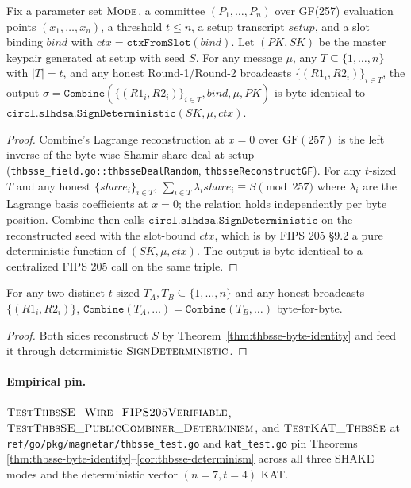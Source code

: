 \begin{theorem}
\label{thm:thbsse-byte-identity}
Fix a parameter set $\textsc{Mode}$, a committee
$(P_1, \ldots, P_n)$ over GF(257) evaluation points
$(x_1, \ldots, x_n)$, a threshold $t \le n$, a setup transcript
$\mathit{setup}$, and a slot binding $\mathit{bind}$ with
$\mathit{ctx} = \texttt{ctxFromSlot}(\mathit{bind})$. Let
$(\mathit{PK}, \mathit{SK})$ be the master keypair generated at
setup with seed $S$. For any message $\mu$, any
$T \subseteq \{1, \ldots, n\}$ with $|T| = t$, and any honest
Round-1/Round-2 broadcasts $\{(R1_i, R2_i)\}_{i \in T}$, the
output
$\sigma = \texttt{Combine}(\{(R1_i, R2_i)\}_{i \in T},
\mathit{bind}, \mu, \mathit{PK})$ is byte-identical to
$\texttt{circl.slhdsa.SignDeterministic}(\mathit{SK}, \mu,
\mathit{ctx})$.
\end{theorem}

\begin{proof}
Combine's Lagrange reconstruction at $x = 0$ over
$\mathrm{GF}(257)$ is the left inverse of the byte-wise Shamir
share deal at setup
(\texttt{thbsse\_field.go::thbsseDealRandom},
\texttt{thbsseReconstructGF}). For any $t$-sized
$T$ and any honest $\{\mathit{share}_i\}_{i \in T}$,
$\sum_{i \in T} \lambda_i \mathit{share}_i \equiv S \pmod{257}$
where $\lambda_i$ are the Lagrange basis coefficients at $x=0$;
the relation holds independently per byte position. Combine
then calls
$\texttt{circl.slhdsa.SignDeterministic}$ on the reconstructed
seed with the slot-bound $\mathit{ctx}$, which is by FIPS 205
\S 9.2 a pure deterministic function of $(\mathit{SK}, \mu,
\mathit{ctx})$. The output is byte-identical to a centralized
FIPS 205 call on the same triple.
\end{proof}

\begin{corollary}
\label{cor:thbsse-determinism}
For any two distinct $t$-sized
$T_A, T_B \subseteq \{1, \ldots, n\}$ and any honest
broadcasts $\{(R1_i, R2_i)\}$,
$\texttt{Combine}(T_A, \dots) = \texttt{Combine}(T_B, \dots)$
byte-for-byte.
\end{corollary}

\begin{proof}
Both sides reconstruct $S$ by
Theorem~\ref{thm:thbsse-byte-identity} and feed it through
deterministic $\textsc{SignDeterministic}$.
\end{proof}

\paragraph{Empirical pin.}
$\textsc{TestThbsSE\_Wire\_FIPS205Verifiable}$,
$\textsc{TestThbsSE\_PublicCombiner\_Determinism}$, and
$\textsc{TestKAT\_ThbsSe}$ at
\texttt{ref/go/pkg/magnetar/thbsse\_test.go} and
\texttt{kat\_test.go} pin Theorems
\ref{thm:thbsse-byte-identity}--\ref{cor:thbsse-determinism}
across all three SHAKE modes and the deterministic vector
$(n=7, t=4)$ KAT.

